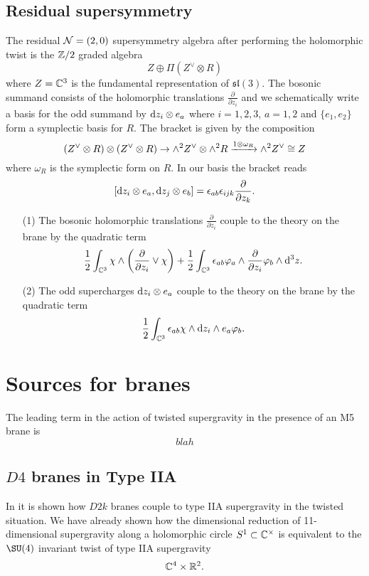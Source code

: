 \documentclass[11pt]{amsart}
\def\ep{\epsilon}
\def\lie#1{\ensuremath{\mathfrak{#1}}}
\begin{document}
\subsection{Residual supersymmetry}

The residual $\mathcal N=(2,0)$ supersymmetry algebra after performing the holomorphic twist is the $\mathbb Z/2$ graded algebra 
\[
Z \oplus \Pi (Z^\vee \otimes R)
\]
where $Z = \mathbb C^3$ is the fundamental representation of $\lie{sl}(3)$. 
The bosonic summand consists of the holomorphic translations $\frac{\partial}{\partial z_i}$ and we schematically write a basis for the odd summand by ${\rm d} z_i \otimes e_a$ where $i=1,2,3$, $a=1,2$ and $\{e_1,e_2\}$ form a symplectic basis for $R$.  
The bracket is given by the composition 
\[
(Z^\vee \otimes R) \otimes (Z^\vee \otimes R) \to \wedge^2 Z^\vee \otimes \wedge^2 R \xrightarrow{1 \otimes \omega_R} \wedge^2 Z^\vee \cong Z
\]
where $\omega_R$ is the symplectic form on $R$. 
In our basis the bracket reads
\[
[\d z_i \otimes e_a, \d z_j \otimes e_b] = \ep_{ab} \ep_{ijk} \frac{\partial}{\partial z_k}.
\]

\begin{itemize}
\item[(1)] The bosonic holomorphic translations $\frac{\partial}{\partial z_i}$ couple to the theory on the brane by the quadratic term
\[
\frac12 \int_{\CC^3} \chi \wedge \left(\frac{\partial}{\partial z_i} \vee \chi\right) + \frac12 \int_{\CC^3} \ep_{ab} \varphi_a \wedge \frac{\partial}{\partial z_i} \varphi_b \wedge \d^3 z .
\]
\item[(2)] The odd supercharges ${\rm d} z_i \otimes e_a$ couple to the theory on the brane by the quadratic term 
\[
\frac12 \int_{\CC^3} \ep_{ab} \chi \wedge \d z_i \wedge e_a \varphi_b .
\]
\end{itemize}

\section{Sources for branes}

The leading term in the action of twisted supergravity in the presence of an M5 brane is
\[
blah
\]

\subsection{$D4$ branes in Type IIA}

In \cite{CLsugra} it is shown how $D2k$ branes couple to type IIA supergravity in the twisted situation. 
We have already shown how the dimensional reduction of 11-dimensional supergravity along a holomorphic circle $S^1 \subset \mathbb C^\times$ is equivalent to the $\SU(4)$ invariant twist of type IIA supergravity
\[
\mathbb C^4 \times \mathbb R^2 .
\]
\end{document}
